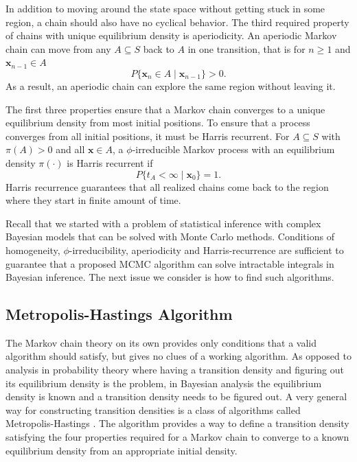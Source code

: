 \documentclass[12pt]{report}
\begin{document}
In addition to moving around the state space without getting stuck in some region, a chain should also have no cyclical behavior. The third required property of chains with unique equilibrium density is aperiodicity. An aperiodic Markov chain can move from any $A \subseteq S$ back to $A$ in one transition, that is for $n \geq 1$ and $\boldsymbol{x}_{n-1} \in A$
\begin{equation}
P\{\boldsymbol{x}_n \in A \mid \boldsymbol{x}_{n-1}\} > 0. 
\end{equation}
As a result, an aperiodic chain can explore the same region without leaving it. 

The first three properties ensure that a Markov chain converges to a unique equilibrium density from most initial positions. To ensure that a process converges from all initial positions, it must be Harris recurrent. For $A \subseteq S$ with $\pi(A) > 0$ and all $\boldsymbol{x} \in A$, a $\phi$-irreducible Markov process with an equilibrium density $\pi(\cdot)$ is Harris recurrent if 
\begin{equation}
P\{t_A < \infty \mid \boldsymbol{x}_0\} = 1.
\end{equation}
Harris recurrence guarantees that all realized chains come back to the region where they start in finite amount of time.

Recall that we started with a problem of statistical inference with complex Bayesian models that can be solved with Monte Carlo methods. Conditions of homogeneity, $\phi$-irreducibility, aperiodicity and Harris-recurrence are sufficient to guarantee that a proposed MCMC algorithm can solve intractable integrals in Bayesian inference. The next issue we consider is how to find such algorithms.

\subsection{Metropolis-Hastings Algorithm}

The Markov chain theory on its own provides only conditions that a valid algorithm should satisfy, but gives no clues of a working algorithm. As opposed to analysis in probability theory where having a transition density and figuring out its equilibrium density is the problem, in Bayesian analysis the equilibrium density is known and a transition density needs to be figured out. A very general way for constructing transition densities is a class of algorithms called Metropolis-Hastings \citep{RobCas2004,GivHoe2012,GelCar2013}. The algorithm provides a way to define a transition density satisfying the four properties required for a Markov chain to converge to a known equilibrium density from an appropriate initial density. 
\end{document}

